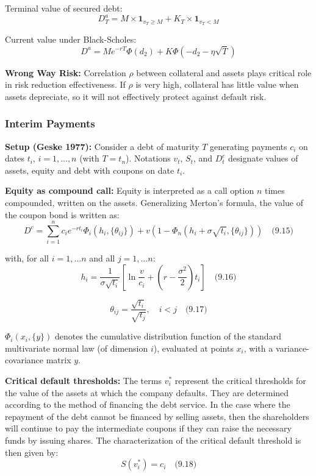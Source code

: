 \documentclass[12pt,a4paper]{article}
\begin{document}
Terminal value of secured debt:
$$D_T^a = M \times \mathbf{1}_{v_T \geq M} + K_T \times \mathbf{1}_{v_T < M}$$

Current value under Black-Scholes:
$$D^a = Me^{-rT}\Phi(d_2) + K\Phi(-d_2 - \eta\sqrt{T})$$

\textbf{Wrong Way Risk:} Correlation $\rho$ between collateral and assets plays critical role in risk reduction effectiveness. If $\rho$ is very high, collateral has little value when assets depreciate, so it will not effectively protect against default risk.

\subsubsection{Interim Payments}

\textbf{Setup (Geske 1977):} Consider a debt of maturity $T$ generating payments $c_i$ on dates $t_i$, $i = 1, \ldots, n$ (with $T = t_n$). Notations $v_t$, $S_t$, and $D_t^c$ designate values of assets, equity and debt with coupons on date $t_i$.

\textbf{Equity as compound call:} Equity is interpreted as a call option $n$ times compounded, written on the assets. Generalizing Merton's formula, the value of the coupon bond is written as:
$$D^c = \sum_{i=1}^{n} c_i e^{-rt_i}\Phi_i(h_i, \{\theta_{ij}\}) + v\left(1 - \Phi_n\left(h_i + \sigma\sqrt{t_i}, \{\theta_{ij}\}\right)\right) \quad \text{(9.15)}$$

with, for all $i = 1, \ldots n$ and all $j = 1, \ldots n$:
$$h_i = \frac{1}{\sigma\sqrt{t_i}} \left[\ln\frac{v}{c_i} + \left(r - \frac{\sigma^2}{2}\right)t_i\right] \quad \text{(9.16)}$$

$$\theta_{ij} = \frac{\sqrt{t_i}}{\sqrt{t_j}}, \quad i < j \quad \text{(9.17)}$$

$\Phi_i(x_i, \{y\})$ denotes the cumulative distribution function of the standard multivariate normal law (of dimension $i$), evaluated at points $x_i$, with a variance-covariance matrix $y$.

\textbf{Critical default thresholds:} The terms $v_i^*$ represent the critical thresholds for the value of the assets at which the company defaults. They are determined according to the method of financing the debt service. In the case where the repayment of the debt cannot be financed by selling assets, then the shareholders will continue to pay the intermediate coupons if they can raise the necessary funds by issuing shares. The characterization of the critical default threshold is then given by:
$$S(v_i^*) = c_i \quad \text{(9.18)}$$
\end{document}
